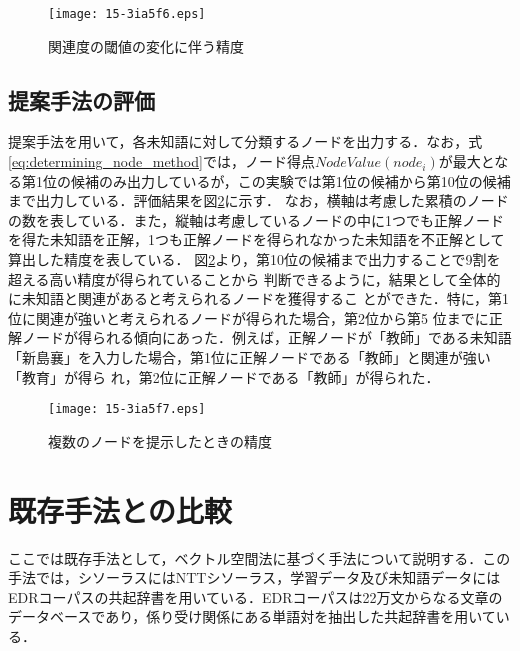 \documentclass[japanese]{jnlp_1.4}
\begin{document}
\begin{figure}[t]
\begin{center}
\texttt{[image: 15-3ia5f6.eps]}
\end{center}
\caption{関連度の閾値の変化に伴う精度}
\label{fig:changing_threshold}
\end{figure}


\subsection{提案手法の評価}\label{unknown_word_evaluation}

提案手法を用いて，各未知語に対して分類するノードを出力する．なお，式\ref{eq:determining_node_method}では，ノード得点$\mathit{NodeValue}(\mathit{node}_i)$が最大となる第1位の候補のみ出力しているが，この実験では第1位の候補から第10位の候補まで出力している．評価結果を図\ref{fig:plural_precision}に示す．
なお，横軸は考慮した累積のノードの数を表している．また，縦軸は考慮しているノードの中に1つでも正解ノードを得た未知語を正解，1つも正解ノードを得られなかった未知語を不正解として算出した精度を表している．
図\ref{fig:plural_precision}より，第10位の候補まで出力することで9割を超える高い精度が得られていることから
判断できるように，結果として全体的に未知語と関連があると考えられるノードを獲得するこ
とができた．特に，第1位に関連が強いと考えられるノードが得られた場合，第2位から第5
位までに正解ノードが得られる傾向にあった．例えば，正解ノードが「教師」である未知語
「新島襄」を入力した場合，第1位に正解ノードである「教師」と関連が強い「教育」が得ら
れ，第2位に正解ノードである「教師」が得られた．

\begin{figure}[t]
\begin{center}
\texttt{[image: 15-3ia5f7.eps]}
\end{center}
\caption{複数のノードを提示したときの精度}
\label{fig:plural_precision}
\end{figure}



\section{既存手法との比較}\label{related_research}

ここでは既存手法として，ベクトル空間法に基づく手法について説明する．この手法では，シソーラスにはNTTシソーラス\cite{NTT_Thesaurus:97}，学習データ及び未知語データにはEDRコーパス\cite{EDR:94}の共起辞書を用いている．EDRコーパスは22万文からなる文章のデータベースであり，係り受け関係にある単語対を抽出した共起辞書を用いている．
\end{document}
